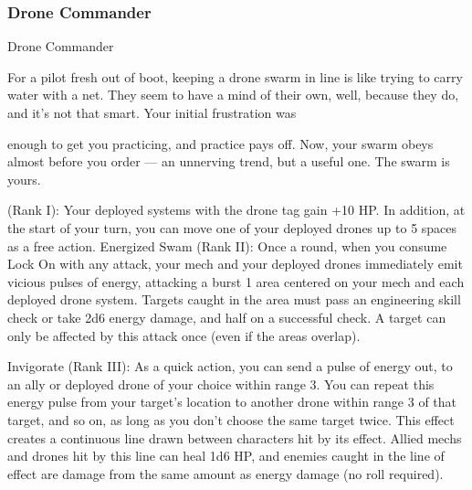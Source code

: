 \subsubsection{Drone Commander}


                                           Drone Commander

For a pilot fresh out of boot, keeping a drone swarm in line is like trying to carry water with a net. They
seem to have a mind of their own, well, because they do, and it’s not that smart. Your initial frustration was

enough to get you practicing, and practice pays off. Now, your swarm obeys almost before you order — an
unnerving trend, but a useful one. The swarm is yours.

(Rank I): Your deployed systems with the drone tag gain +10 HP. In addition, at the start of your
turn, you can move one of your deployed drones up to 5 spaces as a free action.
Energized Swam (Rank II): Once a round, when you consume Lock On with any attack, your
mech and your deployed drones immediately emit vicious pulses of energy, attacking a burst 1
area centered on your mech and each deployed drone system. Targets caught in the area must
pass an engineering skill check or take 2d6 energy damage, and half on a successful check. A
target can only be affected by this attack once (even if the areas overlap).

Invigorate (Rank III): As a quick action, you can send a pulse of energy out, to an ally or
deployed drone of your choice within range 3. You can repeat this energy pulse from your
target’s location to another drone within range 3 of that target, and so on, as long as you don’t
choose the same target twice. This effect creates a continuous line drawn between characters hit
by its effect. Allied mechs and drones hit by this line can heal 1d6 HP, and enemies caught in the
line of effect are damage from the same amount as energy damage (no roll required).